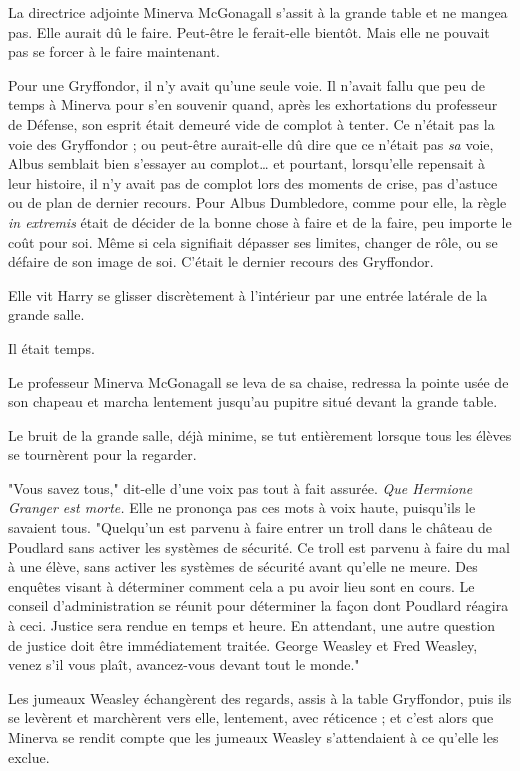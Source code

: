 La directrice adjointe Minerva McGonagall s'assit à la grande table et ne mangea pas. Elle aurait dû le faire. Peut-être le ferait-elle bientôt. Mais elle ne pouvait pas se forcer à le faire maintenant.

Pour une Gryffondor, il n'y avait qu'une seule voie. Il n'avait fallu que peu de temps à Minerva pour s'en souvenir quand, après les exhortations du professeur de Défense, son esprit était demeuré vide de complot à tenter. Ce n'était pas la voie des Gryffondor ; ou peut-être aurait-elle dû dire que ce n'était pas \emph{sa}  voie, Albus semblait bien s'essayer au complot… et pourtant, lorsqu'elle repensait à leur histoire, il n'y avait pas de complot lors des moments de crise, pas d'astuce ou de plan de dernier recours. Pour Albus Dumbledore, comme pour elle, la règle \emph{in extremis}  était de décider de la bonne chose à faire et de la faire, peu importe le coût pour soi. Même si cela signifiait dépasser ses limites, changer de rôle, ou se défaire de son image de soi. C'était le dernier recours des Gryffondor.

Elle vit Harry se glisser discrètement à l'intérieur par une entrée latérale de la grande salle.

Il était temps.

Le professeur Minerva McGonagall se leva de sa chaise, redressa la pointe usée de son chapeau et marcha lentement jusqu'au pupitre situé devant la grande table.

Le bruit de la grande salle, déjà minime, se tut entièrement lorsque tous les élèves se tournèrent pour la regarder.

"Vous savez tous," dit-elle d'une voix pas tout à fait assurée. \emph{Que Hermione Granger est morte.}  Elle ne prononça pas ces mots à voix haute, puisqu'ils le savaient tous. "Quelqu'un est parvenu à faire entrer un troll dans le château de Poudlard sans activer les systèmes de sécurité. Ce troll est parvenu à faire du mal à une élève, sans activer les systèmes de sécurité avant qu'elle ne meure. Des enquêtes visant à déterminer comment cela a pu avoir lieu sont en cours. Le conseil d'administration se réunit pour déterminer la façon dont Poudlard réagira à ceci. Justice sera rendue en temps et heure. En attendant, une autre question de justice doit être immédiatement traitée. George Weasley et Fred Weasley, venez s'il vous plaît, avancez-vous devant tout le monde."

Les jumeaux Weasley échangèrent des regards, assis à la table Gryffondor, puis ils se levèrent et marchèrent vers elle, lentement, avec réticence ; et c'est alors que Minerva se rendit compte que les jumeaux Weasley s'attendaient à ce qu'elle les exclue.

